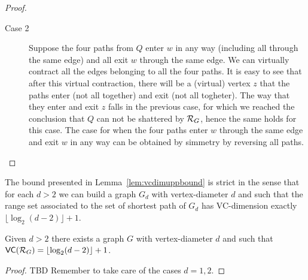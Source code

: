 \begin{proof}
\begin{description}
    \item[Case 2] Suppose the four paths from $Q$ enter $w$ in any way
      (including all through the same edge) and all exit $w$ through the same
      edge. We can virtually contract all the edges belonging to all the four
      paths. It is easy to see that after this
      virtual contraction, there will be a (virtual) vertex $z$ that the paths
      enter (not all together) and exit (not all togheter). The way that they
      enter and exit $z$ falls in the previous case, for which we reached the  
      conclusion that $Q$ can not be shattered by $\mathcal{R}_G$, hence the same
      holds for this case. The case for when the four paths enter $w$ through
      the same edge and exit $w$ in any way can be obtained by simmetry by
      reversing all paths.
  \end{description}
\end{proof}

The bound presented in Lemma~\ref{lem:vcdimuppbound} is strict in the sense that
for each $d>2$ we can build a graph $G_d$ with vertex-diameter $d$ and such
that the range set associated to the set of shortest path of $G_d$ has
VC-dimension exactly $\lfloor\log_2(d-2)\rfloor+1$.

\begin{lemma}
  Given $d>2$ there exists a graph $G$ with vertex-diameter $d$ and such that
  $\mathsf{VC}(\mathcal{R}_G)=\lfloor\log_2(d-2)\rfloor+1$.
\end{lemma}

\begin{proof}
  \XXX TBD Remember to take care of the cases $d=1,2$.
\end{proof}


